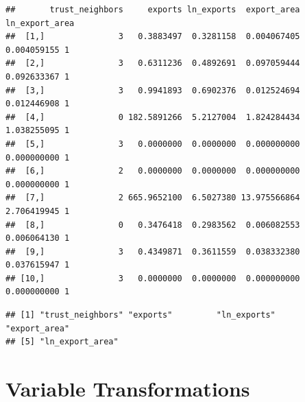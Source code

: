 \documentclass[]{book}
\newenvironment{Shaded}{\begin{snugshade}}{\end{snugshade}}
\newcommand{\CommentTok}[1]{\textcolor[rgb]{0.56,0.35,0.01}{\textit{#1}}}
\newcommand{\KeywordTok}[1]{\textcolor[rgb]{0.13,0.29,0.53}{\textbf{#1}}}
\newcommand{\NormalTok}[1]{#1}
\newcommand{\OperatorTok}[1]{\textcolor[rgb]{0.81,0.36,0.00}{\textbf{#1}}}
\newcommand{\StringTok}[1]{\textcolor[rgb]{0.31,0.60,0.02}{#1}}
\theoremstyle{definition}
\theoremstyle{definition}
\theoremstyle{definition}
\theoremstyle{remark}
\begin{document}
\begin{Shaded}
\begin{Highlighting}[]
\begin{Shaded}
\begin{Highlighting}[]
\begin{verbatim}
##       trust_neighbors     exports ln_exports  export_area ln_export_area  
##  [1,]               3   0.3883497  0.3281158  0.004067405    0.004059155 1
##  [2,]               3   0.6311236  0.4892691  0.097059444    0.092633367 1
##  [3,]               3   0.9941893  0.6902376  0.012524694    0.012446908 1
##  [4,]               0 182.5891266  5.2127004  1.824284434    1.038255095 1
##  [5,]               3   0.0000000  0.0000000  0.000000000    0.000000000 1
##  [6,]               2   0.0000000  0.0000000  0.000000000    0.000000000 1
##  [7,]               2 665.9652100  6.5027380 13.975566864    2.706419945 1
##  [8,]               0   0.3476418  0.2983562  0.006082553    0.006064130 1
##  [9,]               3   0.4349871  0.3611559  0.038332380    0.037615947 1
## [10,]               3   0.0000000  0.0000000  0.000000000    0.000000000 1
\end{verbatim}

\begin{Shaded}
\end{Shaded}

\begin{verbatim}
## [1] "trust_neighbors" "exports"         "ln_exports"      "export_area"    
## [5] "ln_export_area"
\end{verbatim}

\hypertarget{variable-transformations}{%
\section{Variable Transformations}\label{variable-transformations}}


\end{Highlighting}
\end{Shaded}
\end{Highlighting}
\end{Shaded}
\end{document}
